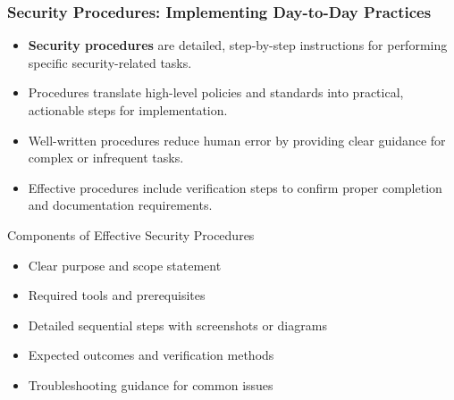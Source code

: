 \documentclass{beamer}
\begin{document}
\begin{frame}
\frametitle{Security Procedures: Implementing Day-to-Day Practices}
\begin{itemize}
\item \textbf{Security procedures} are detailed, step-by-step instructions for performing specific security-related tasks.
\item Procedures translate high-level policies and standards into practical, actionable steps for implementation.
\item Well-written procedures reduce human error by providing clear guidance for complex or infrequent tasks.
\item Effective procedures include verification steps to confirm proper completion and documentation requirements.
\end{itemize}

\begin{block}{Components of Effective Security Procedures}
\scriptsize
\begin{itemize}
\item Clear purpose and scope statement
\item Required tools and prerequisites
\item Detailed sequential steps with screenshots or diagrams
\item Expected outcomes and verification methods
\item Troubleshooting guidance for common issues
\end{itemize}
\end{block}
\end{frame}
\end{document}
